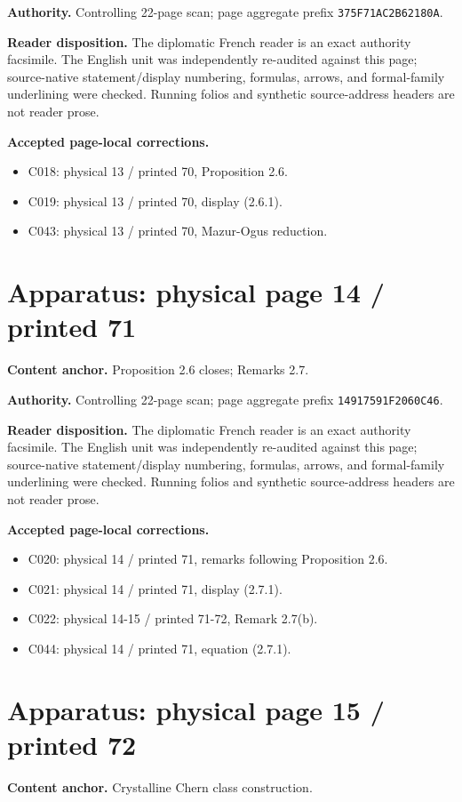\documentclass[10pt]{article}
\begin{document}
\textbf{Authority.} Controlling 22-page scan; page aggregate prefix \texttt{375F71AC2B62180A}.

\textbf{Reader disposition.} The diplomatic French reader is an exact authority facsimile. The English unit was independently re-audited against this page; source-native statement/display numbering, formulas, arrows, and formal-family underlining were checked. Running folios and synthetic source-address headers are not reader prose.

\textbf{Accepted page-local corrections.} \begin{itemize}
\item C018: physical 13 / printed 70, Proposition 2.6.
\item C019: physical 13 / printed 70, display (2.6.1).
\item C043: physical 13 / printed 70, Mazur-Ogus reduction.
\end{itemize}
\newpage
\setcounter{footnote}{0}
\fontsize{10.2pt}{12.04pt}\selectfont
\section*{Apparatus: physical page 14 / printed 71}
\textbf{Content anchor.} Proposition 2.6 closes; Remarks 2.7.

\textbf{Authority.} Controlling 22-page scan; page aggregate prefix \texttt{14917591F2060C46}.

\textbf{Reader disposition.} The diplomatic French reader is an exact authority facsimile. The English unit was independently re-audited against this page; source-native statement/display numbering, formulas, arrows, and formal-family underlining were checked. Running folios and synthetic source-address headers are not reader prose.

\textbf{Accepted page-local corrections.} \begin{itemize}
\item C020: physical 14 / printed 71, remarks following Proposition 2.6.
\item C021: physical 14 / printed 71, display (2.7.1).
\item C022: physical 14-15 / printed 71-72, Remark 2.7(b).
\item C044: physical 14 / printed 71, equation (2.7.1).
\end{itemize}
\newpage
\setcounter{footnote}{0}
\fontsize{10.2pt}{12.04pt}\selectfont
\section*{Apparatus: physical page 15 / printed 72}
\textbf{Content anchor.} Crystalline Chern class construction.
\end{document}
